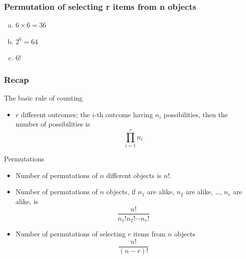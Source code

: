 \documentclass[slidestop,compress,mathserif]{beamer}
\begin{document}
\begin{frame}\frametitle{Permutation of selecting r items from n objects}
\begin{enumerate}[(a)]
\item $6 \times 6 = 36$
\item $2^6 = 64$
\item $6!$
\end{enumerate}


\vspace{1mm}

\end{frame}


\begin{frame}\frametitle{Recap}

The basic rule of counting
\begin{itemize}
\item $r$ different outcomes; the $i$-th outcome having $n_i$ possibilities,
then the number of possibilities is
\[
\prod_{i=1}^r n_i
\]

\end{itemize}

Permutations
\begin{itemize}
\item Number of permutations of $n$ different objects is $n!$.
\item Number of permutations of $n$ objects, if $n_1$ are alike, $n_2$ are alike, \ldots, $n_r$ are alike, is
\[
\frac{n!}{n_1! n_2! \cdots n_r!}
\]
\item Number of permutations of selecting $r$ items from $n$ objects
\[
\frac{n!}{(n-r)!}
\]
\end{itemize}

\end{frame}
\end{document}
